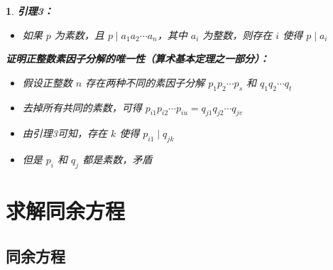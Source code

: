 \documentclass[UTF8]{report}
\theoremstyle{MyLineTheoremStyle} %
\theoremstyle{MyBlockTheoremStyle} %
\theoremstyle{MySubsubsectionStyle} %
\newtheorem{definition}{}
\begin{document}
\begin{definition}
    \textbf{引理3：}
    \begin{itemize}
        \item 如果 $p$ 为素数，且 $p \mid a_1a_2 \cdots a_n$，其中 $a_i$ 为整数，则存在 $i$ 使得 $p \mid a_i$
    \end{itemize}

    \textbf{证明正整数素因子分解的唯一性（算术基本定理之一部分）：}
    \begin{itemize}
        \item 假设正整数 $n$ 存在两种不同的素因子分解 $p_1p_2 \cdots p_s$ 和 $q_1q_2 \cdots q_t$
        \item 去掉所有共同的素数，可得 $p_{i1}p_{i2} \cdots p_{iu} = q_{j1}q_{j2} \cdots q_{jv}$
        \item 由引理3可知，存在 $k$ 使得 $p_{i1} \mid q_{jk}$
        \item 但是 $p_i$ 和 $q_j$ 都是素数，矛盾
    \end{itemize}
\end{definition}



\section{求解同余方程}

\subsection{同余方程}
\end{document}

